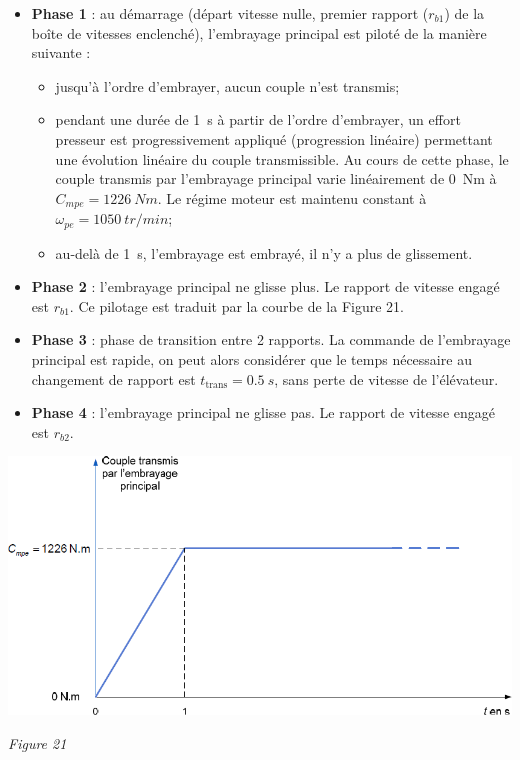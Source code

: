 \documentclass[10pt,fleqn]{article} %
\begin{document}
\begin{itemize}
\item \textbf{Phase 1} : au démarrage (départ vitesse nulle, premier rapport ($r_{b1}$) de la boîte de vitesses enclenché), l’embrayage principal est piloté de la manière suivante : 
\begin{itemize}
\item jusqu’à l’ordre d’embrayer, aucun couple n’est transmis;
\item pendant une durée de \SI{1}{s} à partir de l’ordre d’embrayer, un effort presseur est progressivement appliqué (progression linéaire) permettant une évolution linéaire du couple transmissible. Au cours de cette phase, le couple transmis par l’embrayage principal varie linéairement de \SI{0}{Nm} à $C_{mpe}=\SI{1226}{Nm}$. Le régime moteur est maintenu constant à $\omega_{pe}=\SI{1050}{tr/min}$;
\item au-delà de \SI{1}{s}, l’embrayage est embrayé, il n’y a plus de glissement.
\end{itemize}

\item \textbf{Phase 2} : l’embrayage principal ne glisse plus. Le rapport de vitesse engagé est $r_{b1}$.
Ce pilotage est traduit par la courbe de la Figure 21.
\item \textbf{Phase 3} : phase de transition entre 2 rapports. La commande de l’embrayage principal est rapide, on peut alors considérer que le temps nécessaire au changement de rapport est $t_{\text{trans}} = \SI{0,5}{s}$, sans perte de vitesse de l’élévateur.

\item \textbf{Phase 4} : l'embrayage principal ne glisse pas. Le rapport de vitesse engagé est $r_{b2}$.
\end{itemize}

\begin{center}
\includegraphics[width=.8\linewidth]{images/fig_21}

\textit{Figure 21}
\end{center}
\end{document}
